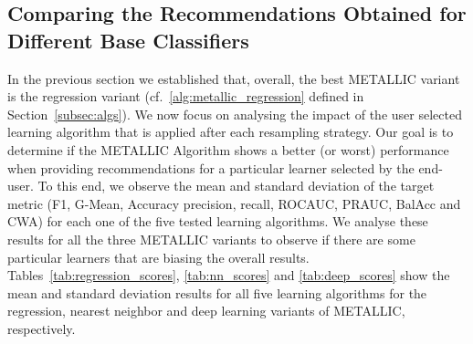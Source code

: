 \documentclass{article}
\begin{document}
\subsection{Comparing the Recommendations Obtained for Different Base Classifiers}\label{sec:res2}


In the previous section we established that, overall, the best METALLIC variant is the regression variant (cf.~\autoref{alg:metallic_regression} defined in Section~\autoref{subsec:algs}). We now focus on analysing the impact of the user selected learning algorithm that is applied after each resampling strategy. Our goal is to determine if the METALLIC Algorithm shows a better (or worst) performance when providing recommendations for a particular learner selected by the end-user. To this end, we observe the mean and standard deviation of the target metric (F1, G-Mean, Accuracy precision, recall, ROCAUC, PRAUC, BalAcc and CWA) for each one of the five tested learning algorithms. We analyse these results for all the three METALLIC variants to observe if there are some particular learners that are biasing the overall results. Tables~\autoref{tab:regression_scores}, \autoref{tab:nn_scores} and \autoref{tab:deep_scores} show the mean and standard deviation results for all five learning algorithms for the regression, nearest neighbor and deep learning variants of METALLIC, respectively. %
\end{document}
